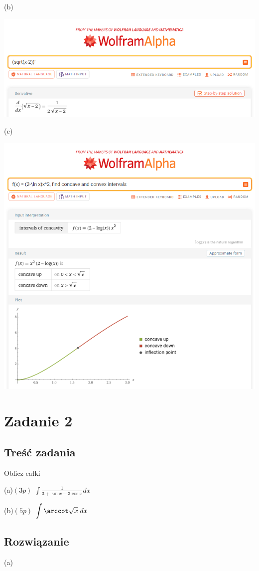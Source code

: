 \documentclass[12pt]{article}
\begin{document}
(b)

\includegraphics[scale=0.35]{am_1_b.png}

(c)

\includegraphics[scale=0.35]{am_1_c.png}

\section{Zadanie 2}
\subsection{Treść zadania}
Oblicz całki

(a)$(3p)$ $\displaystyle \int \frac{1}{3+\sin x+3\cos x} dx$

(b)$(5p)$ $\displaystyle \int \arccot \sqrt{x} \; dx$

\subsection{Rozwiązanie}
(a)
\end{document}
